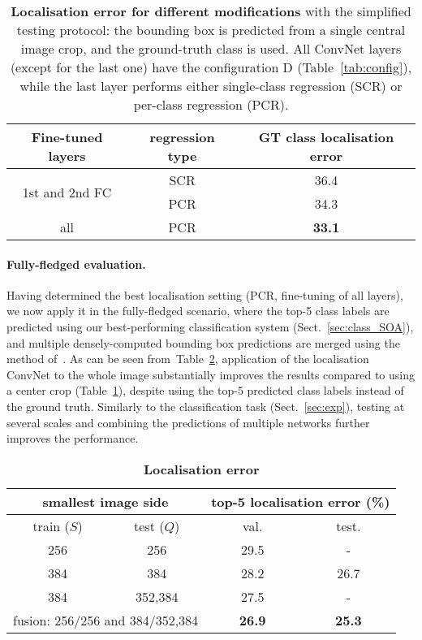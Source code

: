 \documentclass{article} %
\newcommand{\tblref}[1]{Table~\ref{#1}}
\newcommand{\sref}[1]{Sect.~\ref{#1}}
\begin{document}
\begin{table}[htb]
\setlength{\tabcolsep}{2pt}
\small
\centering
\caption{\textbf{Localisation error for different modifications} with
the simplified testing protocol: the bounding box is predicted from a single central image crop, and the ground-truth class is used.
All ConvNet layers (except for the last one) have the configuration D (\tblref{tab:config}), while
the last layer performs either single-class regression (SCR) or per-class regression (PCR). 
}
\begin{tabular}{|c|c|c|} \hline
Fine-tuned layers & regression type & GT class localisation error \\ \hline
\multirow{2}{*}{1st and 2nd FC} & SCR & 36.4 \\ \cline{2-3}
& PCR & 34.3 \\ \hline
all & PCR & \textbf{33.1} \\ \hline
\end{tabular}
\label{tab:loc_comparison}
\end{table}

\paragraph{Fully-fledged evaluation.}
Having determined the best localisation setting (PCR, fine-tuning of all layers), we now apply it in the fully-fledged scenario,
where the top-5 class labels are predicted using our best-performing classification system (\sref{sec:class_SOA}), and multiple densely-computed bounding box predictions are merged using 
the method of~\citet{Sermanet14}.
As can be seen from~\tblref{tab:loc_full}, application of the localisation ConvNet to the whole image substantially improves the results compared to using a center crop (\tblref{tab:loc_comparison}),
despite using the top-5 predicted class labels instead of the ground truth.
Similarly to the classification task (\sref{sec:exp}), testing at several scales and combining the predictions of multiple networks
further improves the performance.

\begin{table}[htb]
\small
\centering
\caption{\textbf{Localisation error}
}
\begin{tabular}{|c|c|c|c|} \hline
\multicolumn{2}{|c|}{smallest image side} & \multicolumn{2}{c|}{top-5 localisation error (\%)} \\ \hline
train ($S$) & test ($Q$) & val. & test. \\ \hline
256 & 256 & 29.5 & - \\ \hline
384 & 384 & 28.2 & 26.7\\ \hline
384 & 352,384 & 27.5 & - \\ \hline\hline
\multicolumn{2}{|c|}{fusion: 256/256 and 384/352,384} & \textbf{26.9} & \textbf{25.3} \\ \hline
\end{tabular}
\label{tab:loc_full}
\end{table}
\end{document}
